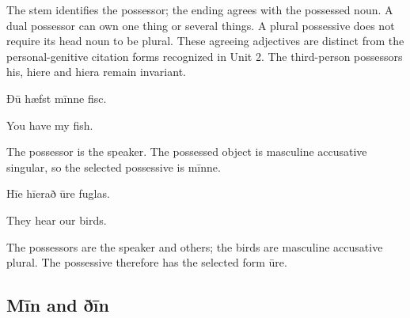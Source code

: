 The stem identifies the possessor; the ending agrees with the possessed noun. A dual possessor can own one thing or several things. A plural possessive does not require its head noun to be plural. These agreeing adjectives are distinct from the personal-genitive citation forms recognized in Unit 2. The third-person possessors his, hiere and hiera remain invariant.

Ðū hæfst mīnne fisc.

You have my fish.

The possessor is the speaker. The possessed object is masculine accusative singular, so the selected possessive is mīnne.

Hīe hīerað ūre fuglas.

They hear our birds.

The possessors are the speaker and others; the birds are masculine accusative plural. The possessive therefore has the selected form ūre.

\subsection*{Mīn and ðīn}

